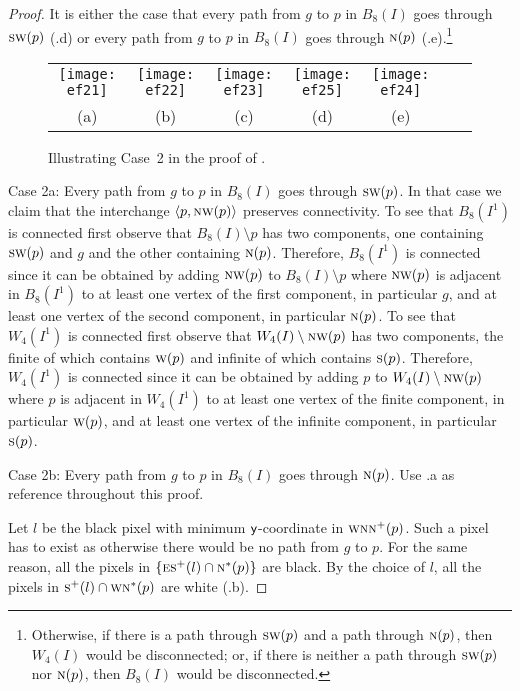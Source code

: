 \documentclass[lotsofwhite,charterfonts]{patmorin}
\newcommand{\N}{\textsc{n}}
\newcommand{\E}{\textsc{e}}
\renewcommand{\S}{\textsc{s}}
\newcommand{\SW}{\textsc{sw}}
\newcommand{\W}{\textsc{w}}
\newcommand{\NW}{\textsc{nw}}
\newcommand{\y}{\ensuremath{\protect\textup{\textsf{y}}}}
\newcommand{\ic}[2]{\langle #1,#2 \rangle}
\newcommand{\sm}{\ensuremath{\setminus}}
\begin{document}
\begin{proof}
It is either the case that every path from $g$ to $p$ in $B_8(I)$ goes
through  $\SW(p)$ (.d) or every path from $g$ to $p$ in
$B_8(I)$ goes through $\N(p)$ (.e).\footnote{Otherwise,
if there is a path through $\SW(p)$ and a path through $\N(p)$, then
$W_4(I)$ would be disconnected; or, if there is neither a path through
$\SW(p)$ nor $\N(p)$, then $B_8(I)$ would be disconnected.}


\begin{figure}[htbp]
\begin{center}
\begin{tabular}{ccccccc}
\texttt{[image: ef21]} & 
\texttt{[image: ef22]} & 
\texttt{[image: ef23]} & 
\texttt{[image: ef25]} & 
\texttt{[image: ef24]} 
\\
(a) & (b) & (c) & (d) & (e)
\end{tabular}
\end{center}
\caption{Illustrating Case~2 in the proof of .}
\end{figure}


\noindent Case 2a: Every path from $g$ to $p$ in $B_8(I)$ goes through $\SW(p)$.  In that case we claim that the interchange $\ic{p}{\NW(p)}$ preserves connectivity. To see that $B_8(I^1)$ is connected first observe that $B_8(I)\sm p$ has two components, one containing $\SW(p)$ and $g$ and the other containing $\N(p)$. Therefore, $B_8(I^1)$ is connected since it can be obtained by adding $\NW(p)$ to $B_8(I)\sm p$ where $\NW(p)$ is adjacent in $B_8(I^1)$ to at least one vertex of the first component, in particular $g$, and at least one vertex of the second component, in particular $\N(p)$. To see that $W_4(I^1)$ is connected first observe that $W_4(I)\sm \NW(p)$ has two components, the finite of which contains $\W(p)$ and infinite of which contains $\S(p)$. Therefore, $W_4(I^1)$ is connected since it can be obtained by adding $p$ to $W_4(I)\sm \NW(p)$ where $p$ is adjacent in $W_4(I^1)$ to at least one vertex of the finite component, in particular $\W(p)$, and at least one vertex of the infinite component, in particular $\S(p)$.



\noindent Case 2b: Every path from $g$ to $p$ in $B_8(I)$ goes through $\N(p)$. Use .a as reference throughout this proof. 

Let $l$ be the black pixel with minimum \y-coordinate in $\W\N\N^+(p)$. Such a pixel has to exist as otherwise there would be no path from $g$ to $p$. For the same reason, all the pixels in $\{\E\S^+(l) \cap \N^*(p)\}$ are black. By the choice of $l$, all the pixels in $\S^+(l) \cap \W\N^*(p)$ are white (.b). 


\end{proof}
\end{document}
